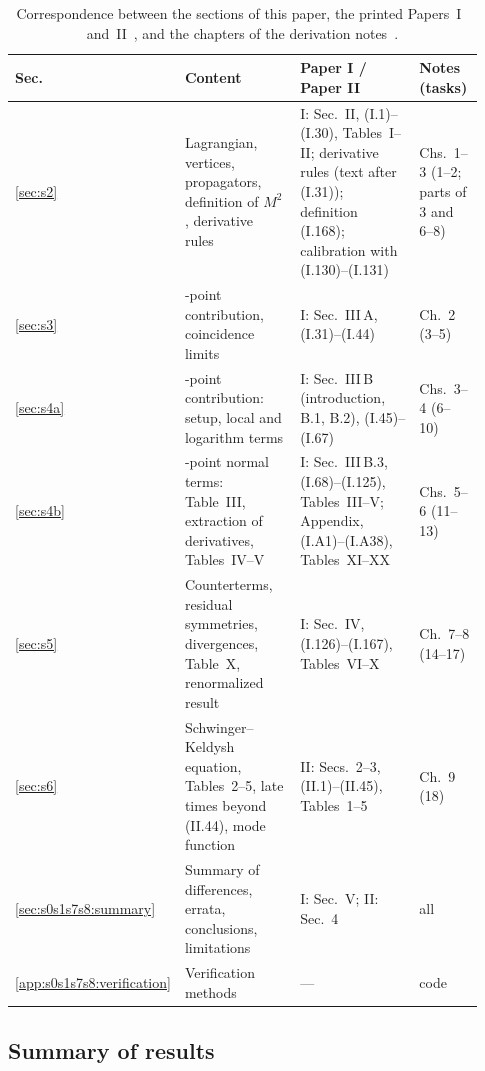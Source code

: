 \documentclass[aps,prd,onecolumn,10pt,nofootinbib,floatfix]{revtex4-2}
\newcommand{\eqI}[1]{(I.#1)}
\newcommand{\eqII}[1]{(II.#1)}
\begin{document}
\begin{table}[tb]
\caption{Correspondence between the sections of this paper, the printed Papers~I~\cite{KW07} and~II~\cite{KW08}, and the chapters of
the derivation notes~\cite{ref:repo}.}
\label{tab:s0s1s7s8:map}
\renewcommand{\arraystretch}{1.25}
\small
\begin{ruledtabular}
\begin{tabular}{@{}>{\raggedright\arraybackslash}p{0.07\linewidth}>{\raggedright\arraybackslash}p{0.33\linewidth}%
>{\raggedright\arraybackslash}p{0.38\linewidth}>{\raggedright\arraybackslash}p{0.15\linewidth}@{}}
Sec. & Content & Paper I / Paper II & Notes (tasks)\\
\hline
\ref{sec:s2} & Lagrangian, vertices, propagators, definition of $M^2$, derivative rules & I: Sec.~II, \eqI{1}--\eqI{30},
Tables~I--II; derivative rules (text after \eqI{31}); definition \eqI{168}; calibration with \eqI{130}--\eqI{131} & Chs.~1--3
(1--2; parts of 3 and 6--8)\\
\ref{sec:s3} & 4-point contribution, coincidence limits & I: Sec.~III\,A, \eqI{31}--\eqI{44} & Ch.~2 (3--5)\\
\ref{sec:s4a} & 3-point contribution: setup, local and logarithm terms & I: Sec.~III\,B (introduction, B.1, B.2), \eqI{45}--\eqI{67}
& Chs.~3--4 (6--10)\\
\ref{sec:s4b} & 3-point normal terms: Table~III, extraction of derivatives, Tables~IV--V & I: Sec.~III\,B.3, \eqI{68}--\eqI{125},
Tables~III--V; Appendix, \eqI{A1}--\eqI{A38}, Tables~XI--XX & Chs.~5--6 (11--13)\\
\ref{sec:s5} & Counterterms, residual symmetries, divergences, Table~X, renormalized result & I: Sec.~IV, \eqI{126}--\eqI{167},
Tables~VI--X & Ch.~7--8 (14--17)\\
\ref{sec:s6} & Schwinger--Keldysh equation, Tables~2--5, late times beyond \eqII{44}, mode function & II: Secs.~2--3, \eqII{1}--\eqII{45},
Tables~1--5 & Ch.~9 (18)\\
\ref{sec:s0s1s7s8:summary} & Summary of differences, errata, conclusions, limitations & I: Sec.~V; II: Sec.~4 & all\\
\ref{app:s0s1s7s8:verification} & Verification methods & --- & code\\
\end{tabular}
\end{ruledtabular}
\end{table}

\subsection{Summary of results}
\label{sec:s0s1s7s8:results}
\end{document}
